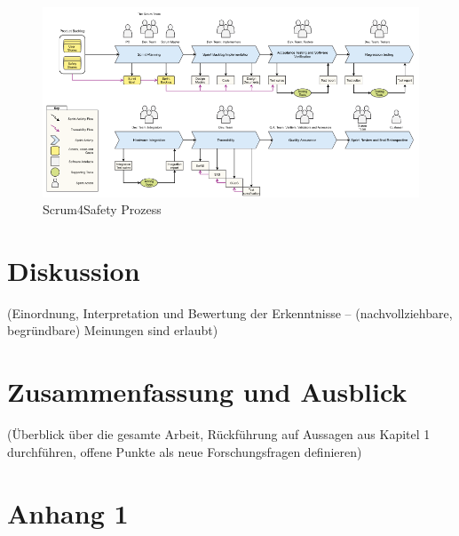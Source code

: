 \documentclass[acmtog]{acmart}
\begin{document}
\begin{figure}
  \centering
  \includegraphics[width=0.9\linewidth]{images/S4S-Safe-Sprint.png}
  \caption{Scrum4Safety Prozess}
  \label{fig:scrum4safety}
\end{figure}



\section{Diskussion}

(Einordnung, Interpretation und Bewertung der Erkenntnisse -- (nachvollziehbare, begründbare) Meinungen sind erlaubt) 



\section{Zusammenfassung und Ausblick}

(Überblick über die gesamte Arbeit, Rückführung auf Aussagen aus Kapitel 1 durchführen, offene Punkte als neue Forschungsfragen definieren)






\appendix

\section{Anhang 1}
\end{document}
